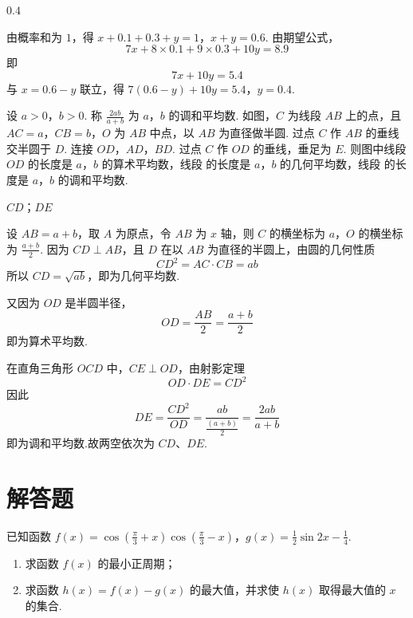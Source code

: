 \begin{answer}
\(0.4\)
\end{answer}

\begin{solution}
由概率和为 \(1\)，得
\(x+0.1+0.3+y=1\)，\(x+y=0.6\).
由期望公式，
\[
7x+8\times0.1+9\times0.3+10y=8.9
\]
即
\[
7x+10y=5.4
\]
与 \(x=0.6-y\) 联立，得
\(7(0.6-y)+10y=5.4\)，\(y=0.4\).
\end{solution}

\begin{problem}
设 \(a > 0\)，\(b > 0\). 称 \(\frac{2ab}{a + b}\) 为 \(a\)，\(b\) 的调和平均数. 如图，\(C\) 为线段 \(AB\) 上的点，且 \(AC = a\)，\(CB = b\)，\(O\) 为 \(AB\) 中点，以 \(AB\) 为直径做半圆. 过点 \(C\) 作 \(AB\) 的垂线交半圆于 \(D\). 连接 \(OD\)，\(AD\)，\(BD\). 过点 \(C\) 作 \(OD\) 的垂线，垂足为 \(E\). 则图中线段 \(OD\) 的长度是 \(a\)，\(b\) 的算术平均数，线段\fillinblank{} 的长度是 \(a\)，\(b\) 的几何平均数，线段\fillinblank{} 的长度是 \(a\)，\(b\) 的调和平均数.

\end{problem}

\begin{answer}
\(CD\)；\(DE\)
\end{answer}

\begin{solution}
设 \(AB=a+b\)，取 \(A\) 为原点，令 \(AB\) 为 \(x\) 轴，则 \(C\) 的横坐标为
\(a\)，\(O\) 的横坐标为 \(\frac{a+b}{2}\). 因为 \(CD\perp AB\)，且 \(D\) 在以
\(AB\) 为直径的半圆上，由圆的几何性质
\[
CD^2=AC\cdot CB=ab
\]
所以 \(CD=\sqrt{ab}\)，即为几何平均数.

又因为 \(OD\) 是半圆半径，
\[
OD=\frac{AB}{2}=\frac{a+b}{2}
\]
即为算术平均数.

在直角三角形 \(OCD\) 中，\(CE\perp OD\)，由射影定理
\[
OD\cdot DE=CD^2
\]
因此
\[
DE=\frac{CD^2}{OD}
=\frac{ab}{\frac{(a+b)}{2}}
=\frac{2ab}{a+b}
\]
即为调和平均数.故两空依次为 \(CD\)、\(DE\).
\end{solution}

\section{解答题}

\begin{problem}
已知函数 \(f(x) = \cos \left( \frac{\pi}{3} + x \right) \cos \left( \frac{\pi}{3} - x \right)\)，\(g(x) = \frac{1}{2} \sin 2x - \frac{1}{4}\).

\begin{enumerate}
\item 求函数 \( f(x) \) 的最小正周期；
\item 求函数 \( h(x) = f(x) - g(x) \) 的最大值，并求使 \( h(x) \) 取得最大值的 \(x\) 的集合.
\end{enumerate}
\end{problem}

